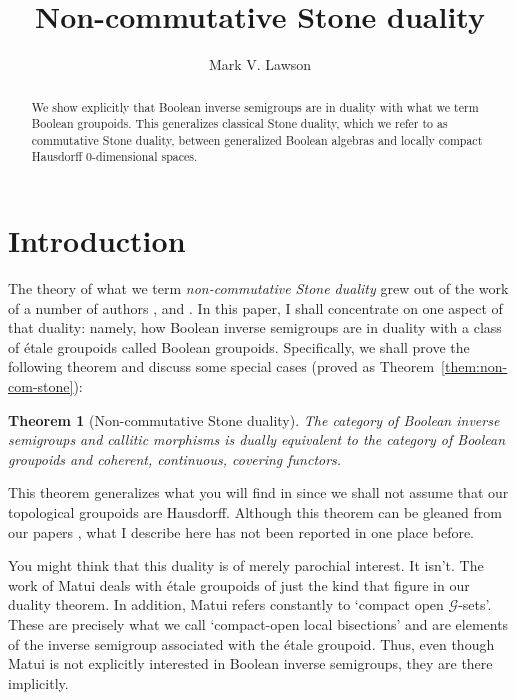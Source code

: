 \documentclass[a4paper]{amsart}
\title{Non-commutative Stone duality}
\author{Mark V. Lawson}
\newtheorem{theorem}{Theorem}[section]
\begin{document}


\begin{abstract}
We show explicitly that Boolean inverse semigroups are in duality with what we term Boolean groupoids.
This generalizes classical Stone duality, which we refer to as commutative Stone duality,
between generalized Boolean algebras and locally compact Hausdorff $0$-dimensional spaces.
\end{abstract}
\maketitle

\section{Introduction}


The theory of what we term {\em non-commutative Stone duality} grew out of the work of a number of authors 
\cite{K, Renault, Paterson},
\cite{Kell1, Kell2, Lenz} 
and 
\cite{LMS, Resende}.
In this paper, I shall concentrate on one aspect of that duality:
namely, how Boolean inverse semigroups are in duality with a class of \'etale groupoids 
called Boolean groupoids.
Specifically, we shall prove the following theorem and discuss some special cases (proved as Theorem~\ref{them:non-com-stone}):

\begin{theorem}[Non-commutative Stone duality] 
The category of Boolean inverse semigroups and callitic morphisms
is dually equivalent to the category of Boolean groupoids and coherent, continuous, covering functors.
\end{theorem}

This theorem generalizes what you will find in \cite{Lawson3} 
since we shall not assume that our topological groupoids are Hausdorff.
Although this theorem can be gleaned from our papers \cite{Lawson3, Lawson5, Lawson2016, Lawson2017, LL},
what I describe here has not been reported in one place before.

You might think that this duality is of merely parochial interest.
It isn't.
The work of Matui \cite{Matui12, Matui13} deals with \'etale groupoids of just the kind that figure in our duality theorem.
In addition, Matui refers constantly to `compact open $\mathcal{G}$-sets'.
These are precisely what we call `compact-open local bisections'
and are elements of the inverse semigroup associated with the \'etale groupoid.
Thus, even though Matui is not explicitly interested in Boolean inverse semigroups,
they are there implicitly.
\end{document}
